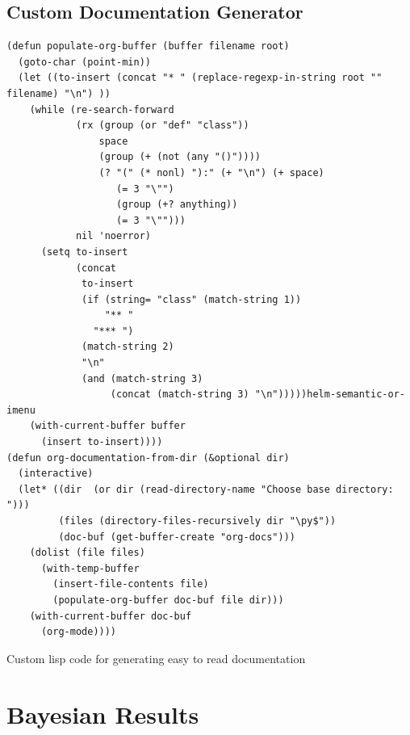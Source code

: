 \documentclass[11pt]{report}
\begin{document}
\section{Custom Documentation Generator}
\label{sec:org75e6da7}
\begin{listing}[htbp]
\begin{verbatim}
(defun populate-org-buffer (buffer filename root)
  (goto-char (point-min))
  (let ((to-insert (concat "* " (replace-regexp-in-string root "" filename) "\n") ))
    (while (re-search-forward
            (rx (group (or "def" "class"))
                space
                (group (+ (not (any "()"))))
                (? "(" (* nonl) "):" (+ "\n") (+ space)
                   (= 3 "\"")
                   (group (+? anything))
                   (= 3 "\"")))
            nil 'noerror)
      (setq to-insert
            (concat
             to-insert
             (if (string= "class" (match-string 1))
                 "** "
               "*** ")
             (match-string 2)
             "\n"
             (and (match-string 3)
                  (concat (match-string 3) "\n")))))helm-semantic-or-imenu
    (with-current-buffer buffer
      (insert to-insert))))
(defun org-documentation-from-dir (&optional dir)
  (interactive)
  (let* ((dir  (or dir (read-directory-name "Choose base directory: ")))
         (files (directory-files-recursively dir "\py$"))
         (doc-buf (get-buffer-create "org-docs")))
    (dolist (file files)
      (with-temp-buffer
        (insert-file-contents file)
        (populate-org-buffer doc-buf file dir)))
    (with-current-buffer doc-buf
      (org-mode))))
\end{verbatim}
\caption{\label{orgc6233b7}
Custom lisp code for generating easy to read documentation}
\end{listing}

\clearpage

\chapter{Bayesian Results}
\label{sec:orgac858c4}
\end{document}
